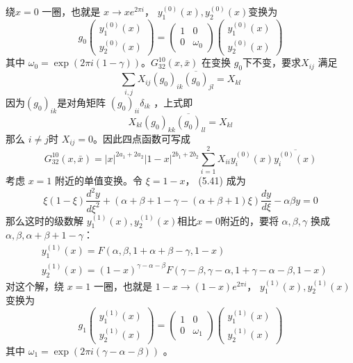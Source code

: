 绕$ x=0$ 一圈，也就是 $x \rightarrow x e^{2 \pi i} $， $y_{1}^{(0)}(x), y_{2}^{(0)}(x) $变换为
\begin{equation}
	g_{0}\left(\begin{array}{c} y_{1}^{(0)}(x) \\ y_{2}^{(0)}(x) \end{array}\right)=\left(\begin{array}{cc} 1 & 0 \\ 0 & \omega_{0} \end{array}\right)\left(\begin{array}{l} y_{1}^{(0)}(x) \\ y_{2}^{(0)}(x) \end{array}\right)
\end{equation} 
其中 $\omega_{0}=\exp (2 \pi i(1-\gamma)) $。$ G_{32}^{10}(x, \bar{x})$ 在变换 $g_0 $下不变，要求$ X_{i j}$ 满足
$$
\sum_{i, j} X_{i j}\left(g_{0}\right)_{i k} \overline{\left(g_{0}\right)}_{j l}=X_{k l}
$$
因为$ \left(g_{0}\right)_{i k} $是对角矩阵 $\left(g_{0}\right)_{i i} \delta_{i k}$ ，上式即
$$
		X_{k l}\left(g_{0}\right)_{k k} \overline{\left(g_{0}\right)}_{l l}=X_{k l} 
$$
那么 $i\neq j $时 $X_{ij}=0 $。因此四点函数可写成
\begin{equation}
	G_{32}^{10}(x, \bar{x})=|x|^{2 a_{1}+2 a_{2}}|1-x|^{2 b_{1}+2 b_{2}} \sum_{i=1}^{2} X_{i i} y_{i}^{(0)}(x) \overline{y_{i}^{(0)}(x)} 
\end{equation}
考虑 $x=1$ 附近的单值变换。令 $\xi=1-x $， (5.41) 成为
\begin{equation}
	\xi(1-\xi) \frac{d^{2} y}{d \xi^{2}}+(\alpha+\beta+1-\gamma-(\alpha+\beta+1) \xi) \frac{d y}{d \xi}-\alpha \beta y=0
\end{equation} 
那么这时的级数解 $y_{1}^{(1)}(x), y_{2}^{(1)}(x) $相比$ x=0 $附近的，要将 $\alpha,\beta,\gamma$ 换成 $\alpha,\beta,\alpha+\beta+1-\gamma $：
\begin{equation}
	\begin{aligned} &y_{1}^{(1)}(x)=F(\alpha, \beta, 1+\alpha+\beta-\gamma, 1-x) \\ &y_{2}^{(1)}(x)=(1-x)^{\gamma-\alpha-\beta} F(\gamma-\beta, \gamma-\alpha, 1+\gamma-\alpha-\beta, 1-x) \end{aligned}
\end{equation}
对这个解，绕 $x=1$ 一圈，也就是 $1-x \rightarrow(1-x) e^{2 \pi i} $， $y_{1}^{(1)}(x), y_{2}^{(1)}(x)$ 变换为
\begin{equation}
	g_{1}\left(\begin{array}{c} y_{1}^{(1)}(x) \\ y_{2}^{(1)}(x) \end{array}\right)=\left(\begin{array}{cc} 1 & 0 \\ 0 & \omega_{1} \end{array}\right)\left(\begin{array}{l} y_{1}^{(1)}(x) \\ y_{2}^{(1)}(x) \end{array}\right)
\end{equation} 
其中 $\omega_{1}=\exp (2 \pi i(\gamma-\alpha-\beta))$ 。

